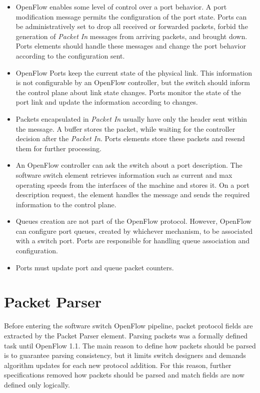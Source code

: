 	\begin{itemize}

	\item OpenFlow enables some level of control over a port behavior. A port modification message permits the configuration of the port state. Ports can be administratively set to drop all received or forwarded packets, forbid the generation of \textit{Packet In} messages from arriving packets, and brought down. Ports elements should handle these messages and change the port behavior according to the configuration sent.

	\item OpenFlow Ports keep the current state of the physical link. This information is not configurable by an OpenFlow controller, but the switch should inform the control plane about link state changes. Ports monitor the state of the port link and update the information according to changes.

	\item Packets encapsulated in \textit{Packet In} usually have only the header sent within the message. A buffer stores the packet, while waiting for the controller decision after the \textit{Packet In}. Ports elements store these packets and resend them for further processing.

	\item An OpenFlow controller can ask the switch about a port description. The software switch element retrieves information such as current and max operating speeds from the interfaces of the machine and stores it. On a port description request, the element handles the message and sends the required information to the control plane.

	\item Queues creation are not part of the OpenFlow protocol. However, OpenFlow can configure port queues, created by whichever mechanism, to be associated with a switch port. Ports are responsible for handling queue association and configuration.  

	\item Ports must update port and queue packet counters.           
	\end{itemize}

	\section{Packet Parser}

	Before entering the software switch OpenFlow pipeline, packet protocol fields are extracted by the Packet Parser element. Parsing packets was a formally defined task until OpenFlow 1.1. The main reason to define how packets should be parsed is to guarantee parsing consistency, but it limits switch designers and demands algorithm updates for each new protocol addition. For this reason, further specifications removed how packets should be parsed and match fields are now defined only logically.

